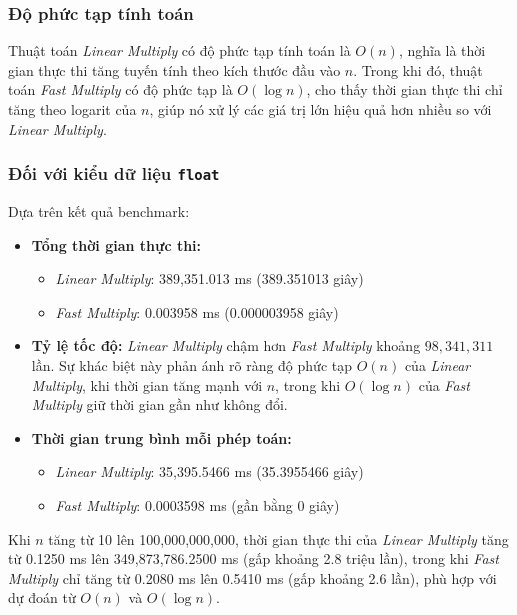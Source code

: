 \subsubsection{Độ phức tạp tính toán}
Thuật toán \textit{Linear Multiply} có độ phức tạp tính toán là $O(n)$, nghĩa là thời gian thực thi tăng tuyến tính theo kích thước đầu vào $n$. Trong khi đó, thuật toán \textit{Fast Multiply} có độ phức tạp là $O(\log n)$, cho thấy thời gian thực thi chỉ tăng theo logarit của $n$, giúp nó xử lý các giá trị lớn hiệu quả hơn nhiều so với \textit{Linear Multiply}.

\subsubsection{Đối với kiểu dữ liệu \texttt{float}}
Dựa trên kết quả benchmark:
\begin{itemize}
    \item \textbf{Tổng thời gian thực thi:}
    \begin{itemize}
        \item \textit{Linear Multiply}: 389,351.013 ms (389.351013 giây)
        \item \textit{Fast Multiply}: 0.003958 ms (0.000003958 giây)
    \end{itemize}
    \item \textbf{Tỷ lệ tốc độ:} \textit{Linear Multiply} chậm hơn \textit{Fast Multiply} khoảng $98,341,311$ lần. Sự khác biệt này phản ánh rõ ràng độ phức tạp $O(n)$ của \textit{Linear Multiply}, khi thời gian tăng mạnh với $n$, trong khi $O(\log n)$ của \textit{Fast Multiply} giữ thời gian gần như không đổi.
    \item \textbf{Thời gian trung bình mỗi phép toán:}
    \begin{itemize}
        \item \textit{Linear Multiply}: 35,395.5466 ms (35.3955466 giây)
        \item \textit{Fast Multiply}: 0.0003598 ms (gần bằng 0 giây)
    \end{itemize}
\end{itemize}

Khi $n$ tăng từ 10 lên 100,000,000,000, thời gian thực thi của \textit{Linear Multiply} tăng từ 0.1250 ms lên 349,873,786.2500 ms (gấp khoảng 2.8 triệu lần), trong khi \textit{Fast Multiply} chỉ tăng từ 0.2080 ms lên 0.5410 ms (gấp khoảng 2.6 lần), phù hợp với dự đoán từ $O(n)$ và $O(\log n)$.


